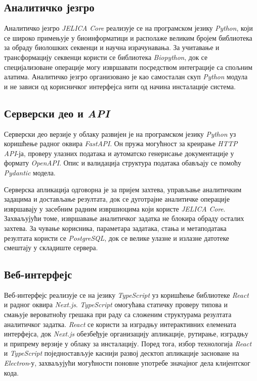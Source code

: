 \documentclass[12pt,oneside]{memoir}
\begin{document}
\subsection{Аналитичко језгро}
Аналитичко језгро \textit{JELICA Core} реализује се на програмском језику \textit{Python}, који се широко примењује у биоинформатици и располаже великим бројем библиотека за обраду биолошких секвенци и научна израчунавања. За учитавање и трансформацију секвенци користи се библиотека \textit{Biopython}, док се специјализоване операције могу извршавати посредством интеграције са спољним алатима. Аналитичко језгро организовано је као самосталан скуп \textit{Python} модула и не зависи од корисничког интерфејса нити од начина инсталације система.


\subsection{Серверски део и \textit{API}}
Серверски део верзије у облаку развијен је на програмском језику \textit{Python} уз коришћење радног оквира \textit{FastAPI}. Он пружа могућност за креирање \textit{HTTP API}-ја, проверу улазних података и аутоматско генерисање документације у формату \textit{OpenAPI}. Опис и валидација структура података обављају се помоћу \textit{Pydantic} модела.

Серверска апликација одговорна је за пријем захтева, управљање аналитичким задацима и достављање резултата, док се дуготрајне аналитичке операције извршавају у засебним радним извршиоцима који користе \textit{JELICA Core}. Захваљујући томе, извршавање аналитичког задатка не блокира обраду осталих захтева. За чување корисника, параметара задатака, стања и метаподатака резултата користи се \textit{PostgreSQL}, док се велике улазне и излазне датотеке смештају у складиште сервера.


\subsection{Веб-интерфејс}
Веб-интерфејс реализује се на језику \textit{TypeScript} уз коришћење библиотеке \textit{React} и радног оквира \textit{Next.js}. \textit{TypeScript} омогућава статичку проверу типова и смањује вероватноћу грешака при раду са сложеним структурама резултата аналитичког задатка. \textit{React} се користи за изградњу интерактивних елемената интерфејса, док \textit{Next.js} обезбеђује организацију апликације, рутирање, изградњу и припрему верзије у облаку за инсталацију. Поред тога, избор технологија \textit{React} и \textit{TypeScript} поједностављује каснији развој десктоп апликације засноване на \textit{Electron}-у, захваљујући могућности поновне употребе значајног дела клијентског кода.
\end{document}
